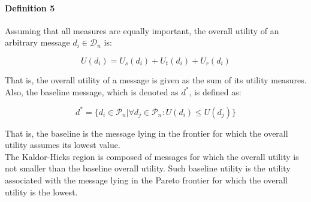\paragraph*{\bf{Definition 5}} Assuming that all measures are equally important, the overall utility of an arbitrary message $d_i\in\mathcal{D}_n$ is:

\begin{equation}
\label{eq:cost}
U(d_i)=U_s(d_i)+U_t(d_i)+U_r(d_i)
\end{equation}

\noindent That is, the overall utility of a message is given as the sum of its utility measures. Also, the baseline message, which is denoted as $d^*$, is defined as:

\begin{equation}
d^*=\{d_i\in\mathcal{P}_n | \forall d_j\in\mathcal{P}_n: U(d_i)\leq U(d_j)\}
\end{equation}

\noindent That is, the baseline is the message lying in the frontier for which the overall utility assumes its lowest value.\\

The Kaldor-Hicks region is composed of messages for which the overall utility is not smaller than the baseline overall utility. Such baseline utility is the utility associated with the message lying in the Pareto frontier for which the overall utility is the lowest.


